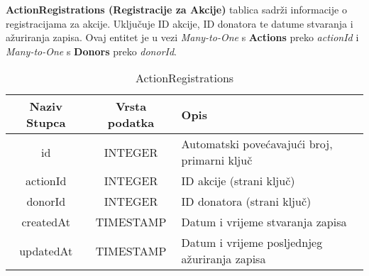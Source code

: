\documentclass[12pt]{article}
\begin{document}
\noindent\textbf{ActionRegistrations (Registracije za Akcije)} tablica sadrži informacije o registracijama za akcije. Uključuje ID akcije, ID donatora te datume stvaranja i ažuriranja zapisa. Ovaj entitet je u vezi \textit{Many-to-One} s \textbf{Actions} preko \textit{actionId} i \textit{Many-to-One} s \textbf{Donors} preko \textit{donorId}.
\begin{table}[H]
    \renewcommand{\arraystretch}{2}
    \centering
     \begin{tabularx}{1\textwidth}{|c|c|X|}
    \hline
    \textbf{Naziv Stupca} & \textbf{Vrsta podatka} & \textbf{Opis} \\
    \hline
    id & INTEGER & Automatski povećavajući broj, primarni ključ\\
    \hline
    actionId & INTEGER & ID akcije (strani ključ) \\
    \hline
    donorId & INTEGER & ID donatora (strani ključ) \\
    \hline
    createdAt & TIMESTAMP & Datum i vrijeme stvaranja zapisa \\
    \hline
    updatedAt & TIMESTAMP & Datum i vrijeme posljednjeg ažuriranja zapisa \\
    \hline
    \end{tabularx}
    \caption{ActionRegistrations}
    \label{tab:my_label}
\end{table}
\clearpage %
\end{document}
